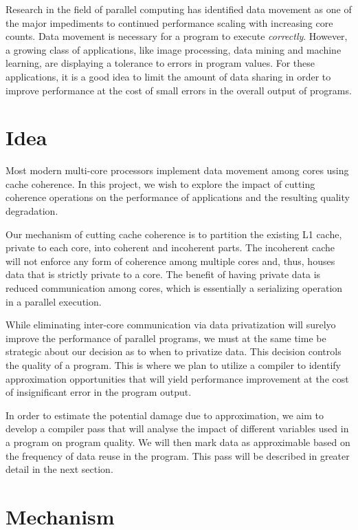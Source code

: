 \documentclass[12pt,conference]{IEEEtran}
\begin{document}
Research in the field of parallel computing has 
identified data movement as one of the major impediments
to continued performance scaling  with increasing core counts. Data movement is necessary for a
program to execute \emph{correctly}. However, a growing class
of applications, like image processing, data mining and machine learning,
are displaying a tolerance to errors in  
program values. For these applications, it is a good idea to limit the 
amount of data sharing in order to improve performance at the cost of 
small errors in the overall output of programs.

\section{Idea}

Most modern multi-core processors implement data movement among cores
using cache coherence. In this project, we wish to explore the impact 
of cutting
coherence operations on the performance of applications and the 
resulting quality degradation. 

Our mechanism of cutting cache coherence is to partition the
existing L1 cache, private to each core, into coherent and 
incoherent parts. The incoherent cache will not
enforce any form of coherence among multiple cores and, thus,
houses data that is strictly private to a core. The benefit of having private
data is reduced communication among cores, which is essentially a 
serializing operation in a parallel execution. 

While eliminating inter-core communication via data privatization
will surelyo improve the performance of parallel programs, we must at the same time
be strategic about our decision as to when to privatize data. This 
decision controls the quality of a program. This is where we plan to 
utilize a compiler to identify approximation opportunities that will 
yield performance improvement at the cost of insignificant error in the
program output.

In order to estimate the potential damage due to approximation, we aim
to develop a compiler pass that will analyse the impact of different 
variables used in a program on program quality. We will then mark data as approximable based 
on the frequency of data reuse in the program. This pass will be 
described in greater detail in the next section.

\section{Mechanism}
\end{document}
